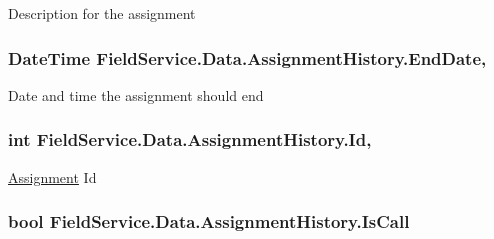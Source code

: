 Description for the assignment 

\hypertarget{class_field_service_1_1_data_1_1_assignment_history_aa08c504502577cf98c7dcaaa75484660}{
\subsubsection[{End\+Date}]{\setlength{\rightskip}{0pt plus 5cm}Date\+Time Field\+Service.\+Data.\+Assignment\+History.\+End\+Date\hspace{0.3cm}{\ttfamily [get]}, {\ttfamily [set]}}}\label{class_field_service_1_1_data_1_1_assignment_history_aa08c504502577cf98c7dcaaa75484660}


Date and time the assignment should end 

\hypertarget{class_field_service_1_1_data_1_1_assignment_history_af535237bdf038d26650fe0ccf7bb5259}{
\subsubsection[{Id}]{\setlength{\rightskip}{0pt plus 5cm}int Field\+Service.\+Data.\+Assignment\+History.\+Id\hspace{0.3cm}{\ttfamily [get]}, {\ttfamily [set]}}}\label{class_field_service_1_1_data_1_1_assignment_history_af535237bdf038d26650fe0ccf7bb5259}


\hyperlink{class_field_service_1_1_data_1_1_assignment}{Assignment} Id 

\hypertarget{class_field_service_1_1_data_1_1_assignment_history_a2475740ab558970e304fe82f78a822d5}{
\subsubsection[{Is\+Call}]{\setlength{\rightskip}{0pt plus 5cm}bool Field\+Service.\+Data.\+Assignment\+History.\+Is\+Call\hspace{0.3cm}{\ttfamily [get]}}}\label{class_field_service_1_1_data_1_1_assignment_history_a2475740ab558970e304fe82f78a822d5}


